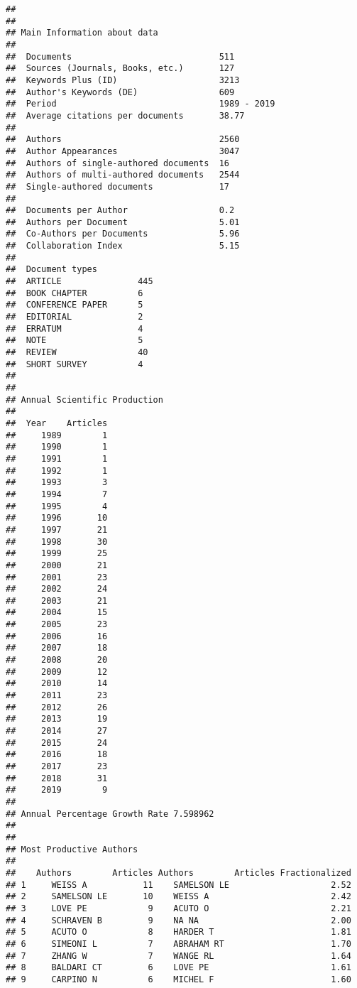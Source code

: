 \documentclass[]{article}
\begin{document}
\begin{verbatim}
## 
## 
## Main Information about data
## 
##  Documents                             511 
##  Sources (Journals, Books, etc.)       127 
##  Keywords Plus (ID)                    3213 
##  Author's Keywords (DE)                609 
##  Period                                1989 - 2019 
##  Average citations per documents       38.77 
## 
##  Authors                               2560 
##  Author Appearances                    3047 
##  Authors of single-authored documents  16 
##  Authors of multi-authored documents   2544 
##  Single-authored documents             17 
## 
##  Documents per Author                  0.2 
##  Authors per Document                  5.01 
##  Co-Authors per Documents              5.96 
##  Collaboration Index                   5.15 
##  
##  Document types                     
##  ARTICLE               445 
##  BOOK CHAPTER          6 
##  CONFERENCE PAPER      5 
##  EDITORIAL             2 
##  ERRATUM               4 
##  NOTE                  5 
##  REVIEW                40 
##  SHORT SURVEY          4 
##  
## 
## Annual Scientific Production
## 
##  Year    Articles
##     1989        1
##     1990        1
##     1991        1
##     1992        1
##     1993        3
##     1994        7
##     1995        4
##     1996       10
##     1997       21
##     1998       30
##     1999       25
##     2000       21
##     2001       23
##     2002       24
##     2003       21
##     2004       15
##     2005       23
##     2006       16
##     2007       18
##     2008       20
##     2009       12
##     2010       14
##     2011       23
##     2012       26
##     2013       19
##     2014       27
##     2015       24
##     2016       18
##     2017       23
##     2018       31
##     2019        9
## 
## Annual Percentage Growth Rate 7.598962 
## 
## 
## Most Productive Authors
## 
##    Authors        Articles Authors        Articles Fractionalized
## 1     WEISS A           11    SAMELSON LE                    2.52
## 2     SAMELSON LE       10    WEISS A                        2.42
## 3     LOVE PE            9    ACUTO O                        2.21
## 4     SCHRAVEN B         9    NA NA                          2.00
## 5     ACUTO O            8    HARDER T                       1.81
## 6     SIMEONI L          7    ABRAHAM RT                     1.70
## 7     ZHANG W            7    WANGE RL                       1.64
## 8     BALDARI CT         6    LOVE PE                        1.61
## 9     CARPINO N          6    MICHEL F                       1.60

\end{verbatim}
\end{document}
